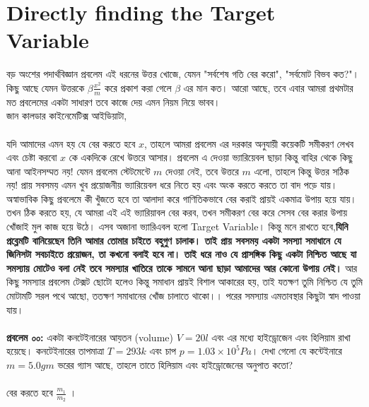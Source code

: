 \documentclass[12pt,a4paper]{article}
\begin{document}
\section{Directly finding the Target Variable}
বড় অংশের পদার্থবিজ্ঞান প্রবলেম এই ধরনের উত্তর খোজে, যেমন "সর্বশেষ গতি বের করো", "সর্বমোট বিভব কত?"। কিছু আছে যেমন উত্তরকে $\beta \frac{x^2}{m}$ করে প্রকাশ করা গেলে $\beta$ এর মান কত। আরো আছে, তবে এবার আমরা প্রথমটার মত প্রবলেমের একটা সাধারণ তবে কাজে দেয় এমন নিয়ম নিয়ে ভাবব। \\
জান কালডার কাইনেমেটিক্স আইডিয়াটা, \\
\\
যদি আমাদের এমন হয় যে বের করতে হবে $x$, তাহলে আমরা প্রবলেম এর দরকার অনুযায়ী কয়েকটি সমীকরণ লেখব এবং চেষ্টা করবো $x$ কে একদিকে রেখে উত্তরে আসার। প্রবলেম এ দেওয়া ভ্যারিয়েবল ছাড়া কিন্তু বাহির থেকে কিছু আনা আইনসম্মত নয়! যেমন প্রবলেম স্টেটমেন্টে $m$ দেওয়া নেই, তবে উত্তরে $m$ এলো, তাহলে কিন্তু উত্তর সঠিক নয়! প্রায় সবসময় এমন খুব প্রয়োজনীয় ভ্যারিয়েবল ধরে নিতে হয় এবং অংক করতে করতে তা বাদ পড়ে যায়। \\
অস্বাভাবিক কিছু প্রবলেমে কী খুঁজতে হবে তা আলাদা করে গাণিতিকভাবে বের করাই প্রায়ই একমাত্র উপায় হয়ে যায়। তখন ঠিক করতে হয়, যে আমরা এই এই ভ্যারিয়াবল বের করব, তখন সমীকরণ বের করে সেসব বের করার উপায় খোঁজাই মুল কাজ হয়ে উঠে। এসব অজানা ভ্যারিএবল হলো Target Variable।
কিন্তু মনে রাখতে হবে,\textbf{যিনি প্রব্লেমটি বানিয়েছেন তিনি আমার তোমার চাইতে বহুগুণ চালাক। তাই প্রায় সবসময় একটা সমস্যা সমাধানে যে জিনিসটা সবচাইতে প্রয়োজন, তা কখনো বলাই হবে না। তাই ধরে নাও যে প্রাসঙ্গিক কিছু একটা নিশ্চিত আছে যা সমস্যায় মোটেও বলা নেই তবে সমস্যার খাতিরে তাকে সামনে আনা ছাড়া আমাদের আর কোনো উপায় নেই।} আর কিছু সমস্যার প্রবলেম টেক্সট ছোটো হলেও কিন্তু সমাধান প্রায়ই বিশাল আকারের হয়, তাই যতক্ষণ তুমি নিশ্চিত যে তুমি মোটামটি সরল পথে আছো, ততক্ষণ সমাধানের খোঁজ চালাতে থাকো।। পরের সমস্যায় এমতাবস্থার কিছুটা স্বাদ পাওয়া যায়। \\
\\
\textbf{প্রবলেম ০০:} একটা কনটেইনারের আয়তন (volume) $V = 20l$ এবং এর মধ্যে হাইড্রোজেন এবং হিলিয়াম রাখা হয়েছে। কনটেইনারের তাপমাত্রা $T= 293k$ এবং চাপ $p = 1.03 \times 10^5 Pa$। দেখা গেলো যে কন্টেইনারে $m = 5.0gm$ ভরের গ্যাস আছে, তাহলে তাতে হিলিয়াম এবং হাইড্রোজেনের অনুপাত কতো?\\
\\
বের করতে হবে $\frac{m_1}{m_2}$ ।\\
\end{document}
